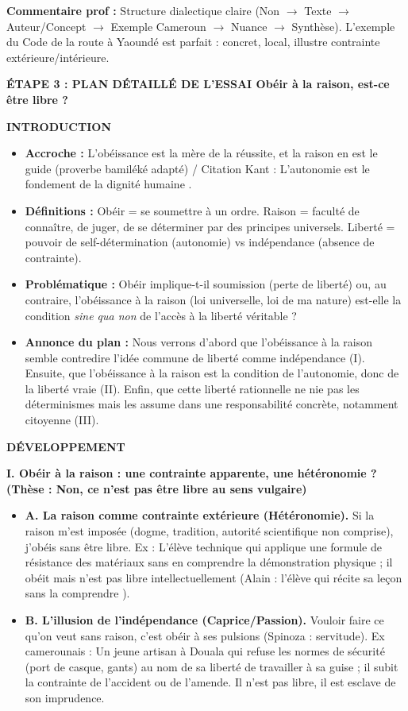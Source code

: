 \documentclass[11pt]{article}
\newcommand{\cle}[1]{{\popxbold\color{popdark}#1}}
\begin{document}
\begin{exoresolu}
\textbf{Commentaire prof :} Structure dialectique claire (Non $\rightarrow$ Texte $\rightarrow$ Auteur/Concept $\rightarrow$ Exemple Cameroun $\rightarrow$ Nuance $\rightarrow$ Synthèse). L'exemple du Code de la route à Yaoundé est parfait : concret, local, illustre contrainte extérieure/intérieure.

\vspace{0.5cm}
\textbf{ÉTAPE 3 : PLAN DÉTAILLÉ DE L'ESSAI \og Obéir à la raison, est-ce être libre ? \fg}

\textbf{INTRODUCTION}
\begin{itemize}
    \item \textbf{Accroche :} \og L'obéissance est la mère de la réussite, et la raison en est le guide \fg (proverbe bamiléké adapté) / Citation Kant : \og L'autonomie est le fondement de la dignité humaine \fg.
    \item \textbf{Définitions :} Obéir = se soumettre à un ordre. Raison = faculté de connaître, de juger, de se déterminer par des principes universels. Liberté = pouvoir de self-détermination (\cle{autonomie}) vs indépendance (absence de contrainte).
    \item \textbf{Problématique :} Obéir implique-t-il soumission (perte de liberté) ou, au contraire, l'obéissance à la raison (loi universelle, loi de ma nature) est-elle la condition \emph{sine qua non} de l'accès à la liberté véritable ?
    \item \textbf{Annonce du plan :} Nous verrons d'abord que l'obéissance à la raison semble contredire l'idée commune de liberté comme indépendance (I). Ensuite, que l'obéissance à la raison est la condition de l'autonomie, donc de la liberté vraie (II). Enfin, que cette liberté rationnelle ne nie pas les déterminismes mais les assume dans une responsabilité concrète, notamment citoyenne (III).
\end{itemize}

\textbf{DÉVELOPPEMENT}

\textbf{I. Obéir à la raison : une contrainte apparente, une hétéronomie ? (Thèse : Non, ce n'est pas être libre au sens vulgaire)}
\begin{itemize}
    \item \textbf{A. La raison comme contrainte extérieure (\cle{Hétéronomie}).} Si la raison m'est imposée (dogme, tradition, autorité scientifique non comprise), j'obéis sans être libre. Ex : L'élève technique qui applique une formule de résistance des matériaux sans en comprendre la démonstration physique ; il \og obéit \fg mais n'est pas libre intellectuellement (Alain : \og l'élève qui récite sa leçon sans la comprendre \fg).
    \item \textbf{B. L'illusion de l'indépendance (Caprice/Passion).} Vouloir \og faire ce qu'on veut \fg sans raison, c'est obéir à ses pulsions (Spinoza : \cle{servitude}). Ex camerounais : Un jeune artisan à Douala qui refuse les normes de sécurité (port de casque, gants) au nom de \og sa liberté \fg de travailler \og à sa guise \fg ; il subit la contrainte de l'accident ou de l'amende. Il n'est pas libre, il est esclave de son imprudence.
\end{itemize}


\end{exoresolu}
\end{document}
